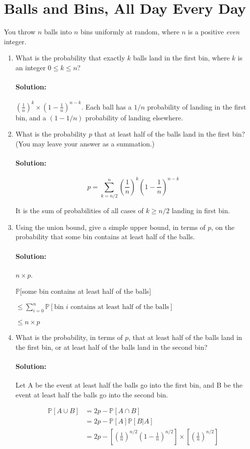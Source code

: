 \documentclass[11pt, notitlepage]{article}
\newcommand{\mP}{\mathbb{P}}
\newcommand{\Question}[1]{\newpage\section{#1}}
\newenvironment{solution}{\paragraph{Solution:}}{\hfill \vspace{10mm}}
\begin{document}
\Question{Balls and Bins, All Day Every Day}

You throw $n$ balls into $n$ bins uniformly at random, where $n$ is a positive \emph{even} integer.
\begin{enumerate}[label=\alph*.)]
    \item What is the probability that exactly $k$ balls land in the first bin, where $k$ is an integer $0 \le k \le n$?
	\begin{solution}
		$\left(\frac{1}{n}\right)^k\times\left(1-\frac{1}{n}\right)^{n-k}$. Each ball has a $1/n$ probability of landing in the first bin, and a $(1-1/n)$ probability of landing elsewhere.
	\end{solution}
    \item What is the probability $p$ that at least half of the balls land in the first bin?
    (You may leave your answer as a summation.)
	\begin{solution}
		$$p=\sum_{k=n/2}^{n}{\left(\frac{1}{n}\right)^k \left(1-\frac{1}{n}\right)^{n-k}}$$
		
		It is the sum of probabilities of all cases of $k\geq n/2$ landing in first bin.
	\end{solution}
    \item Using the union bound, give a simple upper bound, in terms of $p$, on the probability that some bin contains at least half of the balls.
	\begin{solution}$n\times p$.
	
	
		$\mP[$some bin contains at least half of the balls$]$
		
		$\leq \sum_{i=0}^{n}{\mP[\text{bin $i$ contains at least half of the balls}]}$
		
		$\leq n\times p$
	\end{solution}
    \item What is the probability, in terms of $p$, that at least half of the balls land in the first bin, or at least half of the balls land in the second bin?
   	\begin{solution} Let A be the event at least half the balls go into the first bin, and B be the event at least half the balls go into the second bin.
   	
   	\begin{align*} \mP[A\cup B] &= 2p - \mP[A\cap B] \\
   	&= 2p - \mP[A]\mP[B|A] \\
   	&= 2p- \left[\left(\frac{1}{n}\right)^{n/2} \left(1-\frac{1}{n}\right)^{n/2}\right]\times \left[\left(\frac{1}{n}\right)^{n/2}\right]
   	\end{align*}
   	

\end{solution}
\end{enumerate}
\end{document}
